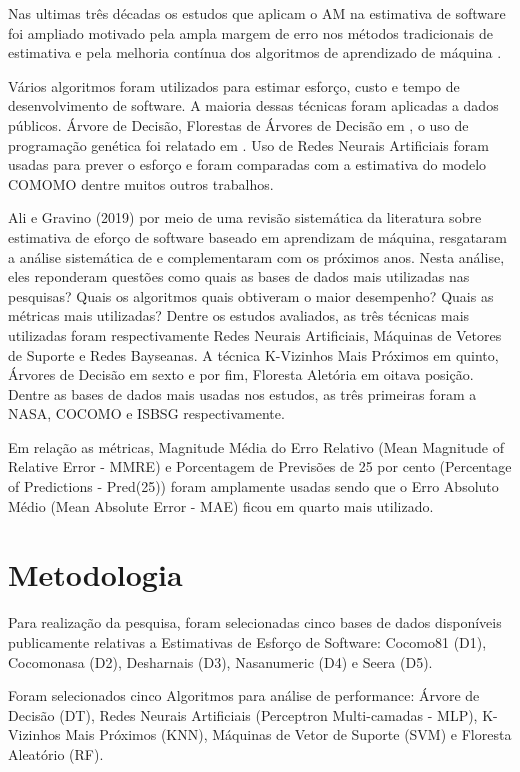 \documentclass[12pt]{article}
\begin{document}
Nas ultimas três décadas os estudos que aplicam o AM na estimativa de software foi ampliado motivado pela ampla margem de erro nos métodos tradicionais de estimativa e pela melhoria contínua dos algoritmos de aprendizado de máquina \cite{banimustafa:2018}.

Vários algoritmos foram utilizados para estimar esforço, custo e tempo de desenvolvimento de software. A maioria dessas técnicas foram aplicadas a dados públicos. Árvore de Decisão, Florestas de Árvores de Decisão em \cite{nassifetal:2013}, o uso de programação genética foi relatado em \cite{chavoyaetal:2012}. Uso de Redes Neurais Artificiais foram usadas para prever o esforço e foram comparadas com a estimativa do modelo COMOMO \cite{trontoetal:2007, bhatiaattri:2015} dentre muitos outros trabalhos.

Ali e Gravino (2019) por meio de uma revisão sistemática da literatura sobre estimativa de eforço de software baseado em aprendizam de máquina, resgataram a análise sistemática de \cite{wen:2012} e complementaram com os próximos anos. Nesta análise, eles reponderam questões como quais as bases de dados mais utilizadas nas pesquisas? Quais os algoritmos quais obtiveram o maior desempenho? Quais as métricas mais utilizadas? Dentre os estudos avaliados, as três técnicas mais utilizadas foram respectivamente Redes Neurais Artificiais, Máquinas de Vetores de Suporte e Redes Bayseanas. A técnica K-Vizinhos Mais Próximos em quinto, Árvores de Decisão em sexto e por fim, Floresta Aletória em oitava posição. Dentre as bases de dados mais usadas nos estudos, as três primeiras foram a NASA, COCOMO e ISBSG respectivamente.

Em relação as métricas, Magnitude Média do Erro Relativo (Mean Magnitude of Relative Error - MMRE) e Porcentagem de Previsões de 25 por cento (Percentage of Predictions - Pred(25)) foram amplamente usadas sendo que o Erro Absoluto Médio (Mean Absolute Error - MAE) ficou em quarto mais utilizado.

\section{Metodologia}

Para realização da pesquisa, foram selecionadas cinco bases de dados disponíveis publicamente  relativas a Estimativas de Esforço de Software: Cocomo81 (D1), Cocomonasa (D2), Desharnais (D3), Nasanumeric (D4) e Seera (D5)\cite{promise:2005, nasanumeric:2014, seera:2020}.

Foram selecionados cinco Algoritmos para análise de performance: Árvore de Decisão (DT), Redes Neurais Artificiais (Perceptron Multi-camadas - MLP), K-Vizinhos Mais Próximos (KNN), Máquinas de Vetor de Suporte (SVM) e Floresta Aleatório (RF).
\end{document}
